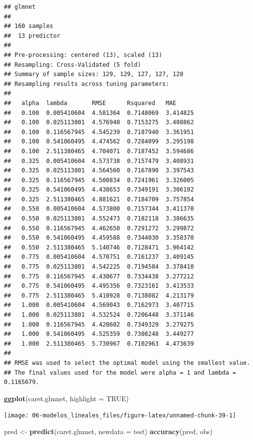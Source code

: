 \documentclass[
  spanish,
]{book}
\newenvironment{Shaded}{\begin{snugshade}}{\end{snugshade}}
\newcommand{\DataTypeTok}[1]{\textcolor[rgb]{0.13,0.29,0.53}{#1}}
\newcommand{\KeywordTok}[1]{\textcolor[rgb]{0.13,0.29,0.53}{\textbf{#1}}}
\newcommand{\NormalTok}[1]{#1}
\newcommand{\OtherTok}[1]{\textcolor[rgb]{0.56,0.35,0.01}{#1}}
\newcommand{\StringTok}[1]{\textcolor[rgb]{0.31,0.60,0.02}{#1}}
\theoremstyle{break}
\theoremstyle{definition}
\theoremstyle{definition}
\theoremstyle{definition}
\theoremstyle{remark}
\begin{document}
\begin{verbatim}
## glmnet 
## 
## 160 samples
##  13 predictor
## 
## Pre-processing: centered (13), scaled (13) 
## Resampling: Cross-Validated (5 fold) 
## Summary of sample sizes: 129, 129, 127, 127, 128 
## Resampling results across tuning parameters:
## 
##   alpha  lambda       RMSE      Rsquared   MAE     
##   0.100  0.005410604  4.581364  0.7148069  3.414825
##   0.100  0.025113801  4.576940  0.7153275  3.408862
##   0.100  0.116567945  4.545239  0.7187940  3.361951
##   0.100  0.541060495  4.474562  0.7284099  3.295198
##   0.100  2.511380465  4.704071  0.7187452  3.594686
##   0.325  0.005410604  4.573738  0.7157479  3.408931
##   0.325  0.025113801  4.564560  0.7167890  3.397543
##   0.325  0.116567945  4.500834  0.7241961  3.326005
##   0.325  0.541060495  4.438653  0.7349191  3.306102
##   0.325  2.511380465  4.881621  0.7184709  3.757854
##   0.550  0.005410604  4.573800  0.7157344  3.411370
##   0.550  0.025113801  4.552473  0.7182118  3.386635
##   0.550  0.116567945  4.462650  0.7291272  3.299872
##   0.550  0.541060495  4.459588  0.7344030  3.358370
##   0.550  2.511380465  5.140746  0.7128471  3.964142
##   0.775  0.005410604  4.570751  0.7161237  3.409145
##   0.775  0.025113801  4.542225  0.7194584  3.378410
##   0.775  0.116567945  4.430677  0.7334438  3.277212
##   0.775  0.541060495  4.495356  0.7323161  3.413533
##   0.775  2.511380465  5.410928  0.7138082  4.213179
##   1.000  0.005410604  4.569043  0.7162973  3.407715
##   1.000  0.025113801  4.532524  0.7206448  3.371146
##   1.000  0.116567945  4.420602  0.7349329  3.279275
##   1.000  0.541060495  4.525359  0.7308248  3.449277
##   1.000  2.511380465  5.730967  0.7102963  4.473639
## 
## RMSE was used to select the optimal model using the smallest value.
## The final values used for the model were alpha = 1 and lambda = 0.1165679.
\end{verbatim}

\begin{Shaded}
\begin{Highlighting}[]
\KeywordTok{ggplot}\NormalTok{(caret.glmnet, }\DataTypeTok{highlight =} \OtherTok{TRUE}\NormalTok{)}
\end{Highlighting}
\end{Shaded}

\begin{center}\texttt{[image: 06-modelos\_lineales\_files/figure-latex/unnamed-chunk-39-1]} \end{center}

\begin{Shaded}
\begin{Highlighting}[]
\NormalTok{pred <-}\StringTok{ }\KeywordTok{predict}\NormalTok{(caret.glmnet, }\DataTypeTok{newdata =}\NormalTok{ test)}
\KeywordTok{accuracy}\NormalTok{(pred, obs)}
\end{Highlighting}
\end{Shaded}
\end{document}
